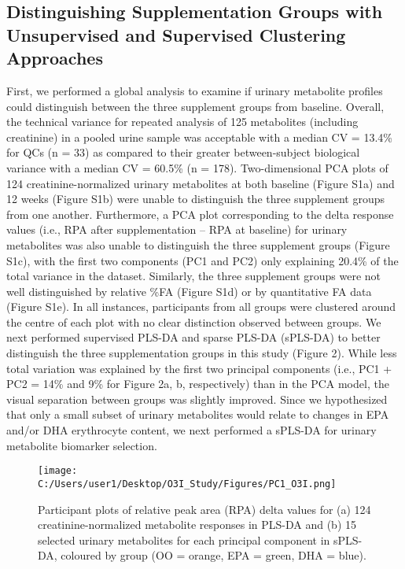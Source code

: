 \documentclass[journal=jacsat,manuscript=article]{achemso}
\begin{document}
\subsection{Distinguishing Supplementation Groups with Unsupervised and
Supervised Clustering
Approaches}\label{distinguishing-supplementation-groups-with-unsupervised-and-supervised-clustering-approaches}

First, we performed a global analysis to examine if urinary metabolite
profiles could distinguish between the three supplement groups from
baseline. Overall, the technical variance for repeated analysis of 125
metabolites (including creatinine) in a pooled urine sample was
acceptable with a median CV = 13.4\% for QCs (n = 33) as compared to
their greater between-subject biological variance with a median CV =
60.5\% (n = 178). Two-dimensional PCA plots of 124 creatinine-normalized
urinary metabolites at both baseline (Figure S1a) and 12 weeks (Figure
S1b) were unable to distinguish the three supplement groups from one
another. Furthermore, a PCA plot corresponding to the delta response
values (i.e., RPA after supplementation -- RPA at baseline) for urinary
metabolites was also unable to distinguish the three supplement groups
(Figure S1c), with the first two components (PC1 and PC2) only
explaining 20.4\% of the total variance in the dataset. Similarly, the
three supplement groups were not well distinguished by relative \%FA
(Figure S1d) or by quantitative FA data (Figure S1e). In all instances,
participants from all groups were clustered around the centre of each
plot with no clear distinction observed between groups. We next
performed supervised PLS-DA and sparse PLS-DA (sPLS-DA) to better
distinguish the three supplementation groups in this study (Figure 2).
While less total variation was explained by the first two principal
components (i.e., PC1 + PC2 = 14\% and 9\% for Figure 2a, b,
respectively) than in the PCA model, the visual separation between
groups was slightly improved. Since we hypothesized that only a small
subset of urinary metabolites would relate to changes in EPA and/or DHA
erythrocyte content, we next performed a sPLS-DA for urinary metabolite
biomarker selection.

\begin{figure}
\centering
\texttt{[image: C:/Users/user1/Desktop/O3I\_Study/Figures/PC1\_O3I.png]}
\caption{Participant plots of relative peak area (RPA) delta values for
(a) 124 creatinine-normalized metabolite responses in PLS-DA and (b) 15
selected urinary metabolites for each principal component in sPLS-DA,
coloured by group (OO = orange, EPA = green, DHA = blue).}
\end{figure}
\end{document}
